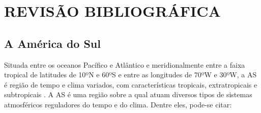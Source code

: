 \hypertarget{estilo:capitulo}{}
\chapter{REVISÃO BIBLIOGRÁFICA}

\section{A América do Sul}
\label{ss:americadosul}

Situada entre os oceanos Pacífico e Atlântico e meridionalmente entre a faixa tropical de latitudes de 10ºN e 60ºS e entre as longitudes de 70ºW e 30ºW, a AS é região de tempo e clima variados, com características tropicais, extratropicais e subtropicais \cite{satyamurtyetal98}. A AS é uma região sobre a qual atuam diversos tipos de sistemas atmosféricos reguladores do tempo e do clima. Dentre eles, pode-se citar: 

